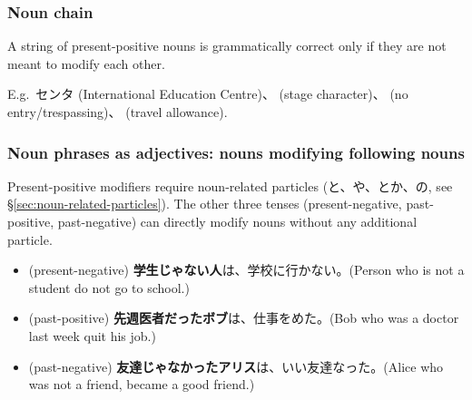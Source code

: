 \documentclass[../nihongo-gakushuu-kyouzai.tex]{subfiles}
\begin{document}
\subsubsection{Noun chain}
A string of present-positive nouns is grammatically correct only if they are not meant to modify each other.

E.g.\ センタ (International Education Centre)、 (stage character)、 (no entry/trespassing)、 (travel allowance).

\subsubsection{Noun phrases as adjectives: nouns modifying following nouns}
Present-positive modifiers require noun-related particles (と、や、とか、の, see \S\ref{sec:noun-related-particles}). The other three tenses (present-negative, past-positive, past-negative) can directly modify nouns without any additional particle.
\begin{itemize}
    \item (present-negative) \textbf{学生じゃない人}は、学校に行かない。(Person who is not a student do not go to school.)
    \item (past-positive) \textbf{先週医者だったボブ}は、仕事をめた。(Bob who was a doctor last week quit his job.)
    \item (past-negative) \textbf{友達じゃなかったアリス}は、いい友達なった。(Alice who was not a friend, became a good friend.)
\end{itemize}
\end{document}
